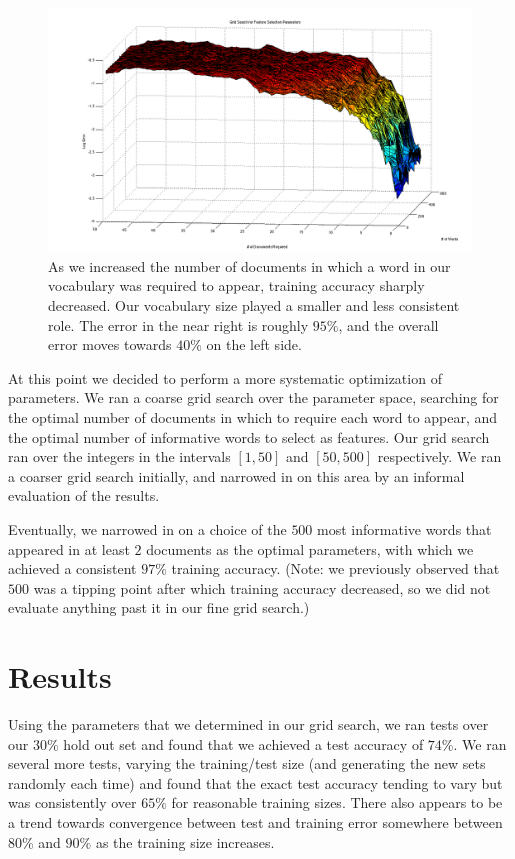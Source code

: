 \documentclass[11pt,acticle]{scrartcl}
\begin{document}
\begin{figure}[H]
\includegraphics[scale=0.4]{feature_selection.png}
\caption{As we increased the number of documents in which a word in our vocabulary was required to appear, training accuracy sharply decreased. Our vocabulary size played a smaller and less consistent role. The error in the near right is roughly $95\%$, and the overall error moves towards $40\%$ on the left side.}
\end{figure}

\begin{multicols}{2}
At this point we decided to perform a more systematic optimization of parameters. We ran a coarse grid search over the parameter space, searching for the optimal number of documents in which to require each word to appear, and the optimal number of informative words to select as features. Our grid search ran over the integers in the intervals $[1,50]$ and $[50, 500]$ respectively. We ran a coarser grid search initially, and narrowed in on this area by an informal evaluation of the results.

Eventually, we narrowed in on a choice of the $500$ most informative words that appeared in at least $2$ documents as the optimal parameters, with which we achieved a consistent $97\%$ training accuracy. (Note: we previously observed that $500$ was a tipping point after which training accuracy decreased, so we did not evaluate anything past it in our fine grid search.)

\section{Results}
Using the parameters that we determined in our grid search, we ran tests over our $30\%$ hold out set and found that we achieved a test accuracy of $74\%$. We ran several more tests, varying the training/test size (and generating the new sets randomly each time) and found that the exact test accuracy tending to vary but was consistently over $65\%$ for reasonable training sizes. There also appears to be a trend towards convergence between test and training error somewhere between $80\%$ and $90\%$ as the training size increases.

\end{multicols}
\end{document}
